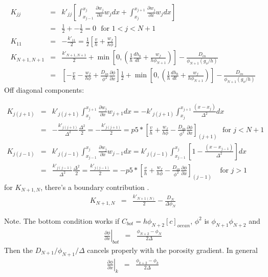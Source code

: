 \begin{eqnarray}
K_{jj} &=& k'_{jj}\left[ \int_{x_{j-1}}^{x_j} \frac{\partial w_j}{\partial x}
w_j dx + \int_{x_{j}}^{x_{j+1}} \frac{\partial w_j}{\partial x}
w_j dx \right] \nonumber \\
&  = &  \frac{1}{2} + -\frac{1}{2} = 0  \ \ \ \mbox{for } 1 < j < N+1 \nonumber \\
K_{11} & = &  -\frac{k'_{11}}{2} = \frac{1}{2}\left[\frac{v}{h} +
  \frac{w_f}{h\phi}\right] \nonumber \\
K_{N+1,N+1}  & = & \frac{k'_{N+1,N+1}}{2} +\min\left[0, \left(\frac{1}{h}\frac{dh_b}{dt} +
\frac{w_f}{h \phi_{N+1}}\right)\right] -
\frac{D_{in}}{\phi_{N+1}(g_o/h)} \nonumber \\
& = & \left[-\frac{v}{h} - \frac{w_f}{h\phi}+ \frac{D_{in}}{\phi^2}\frac{\partial
      \phi}{\partial x}\right]\frac{1}{2} +\min\left[0, \left(\frac{1}{h}\frac{dh_b}{dt} +
\frac{w_f}{h \phi_{N+1}}\right)\right] -
\frac{D_{in}}{\phi_{N+1}(g_o/h)} \nonumber
\end{eqnarray}
Off diagonal components:

\begin{eqnarray}
K_{j(j+1)} &=& k'_{j(j+1)}\int_{x_{j}}^{x_{j+1}} \frac{\partial w_j}{\partial x}
w_{j+1} dx  =
-k'_{j(j+1)}\int_{x_{j}}^{x_{j+1}}\frac{(x-x_j)}{\Delta^2}dx \nonumber
\\
& = & -\frac{k'_{j(j+1)}}{\Delta^2}\frac{\Delta^2}{2} =
-\frac{k'_{j(j+1)}}{2}  = p5*\left[\frac{v}{h} + \frac{w_f}{h\phi}- \frac{D_{in}}{\phi^2}\frac{\partial
      \phi}{\partial x}\right]_{(j+1)} \ \ \ \mbox{for }  j < N+1 \nonumber \\
K_{j(j-1)} &=& k'_{j(j-1)}\int_{x_{j-1}}^{x_{j}} \frac{\partial w_j}{\partial x}
w_{j-1} dx  =
k'_{j(j-1)}\int_{x_{j-1}}^{x_{j}}\left[1 -
  \frac{(x-x_{j-1})}{\Delta^2}\right] dx \nonumber
\\
& = & \frac{k'_{j(j-1)}}{\Delta^2}\frac{\Delta^2}{2} =
\frac{k'_{j(j-1)}}{2}  = -p5*\left[\frac{v}{h} + \frac{w_f}{h\phi}- \frac{D_{in}}{\phi^2}\frac{\partial
      \phi}{\partial x}\right]_{(j-1)} \ \ \ \ \ \mbox{for }  j > 1
\end{eqnarray}
for $K_{N+1,N}$, there's a boundary contribution .
\begin{eqnarray}
K_{N+1,N} & = & \frac{k'_{N+1(N)}}{2} - \frac{D_N}{\Delta \phi_{N}}
\end{eqnarray}

Note.  The bottom condition works if $C_{bot} = h
\phi_{N+2}[c]_{ocean}$, $\phi^2$ is $\phi_{N+1}\phi_{N+2}$ and
\begin{eqnarray}
\left. \frac{\partial \phi}{\partial x}\right|_{bot} & = &
\frac{\phi_{N+2} - \phi_{N}}{2\Delta}
\end{eqnarray}
Then the $D_{N+1}/\phi_{N+1}/\Delta$ cancels properly with the
porosity gradient.    In general
\begin{eqnarray}
\left. \frac{\partial \phi}{\partial x}\right|_{k} & = &
\frac{\phi_{k+2} - \phi_{k}}{2\Delta}
\end{eqnarray}

